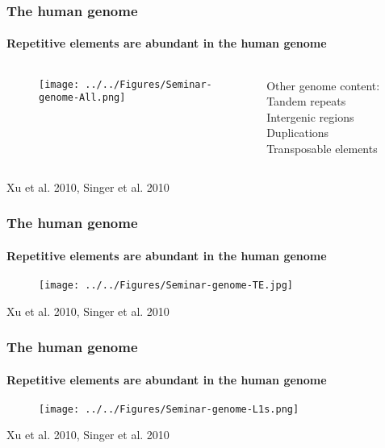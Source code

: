 \documentclass{beamer}
\begin{document}
		\begin{frame} %
			
			\frametitle{The human genome}
			\framesubtitle{Repetitive elements are abundant in the human genome}
			
			\begin{columns}
				\begin{column}{0.6\linewidth}
					
					\begin{figure}
						\texttt{[image: ../../Figures/Seminar-genome-All.png]}			
					\end{figure}
				\end{column}
			
				\begin{column}{0.4\linewidth}
					\begin{block}{Other genome content:}
						Tandem repeats\\
						Intergenic regions\\
						Duplications\\
						Transposable elements
					\end{block}
				\end{column}
			\end{columns}
	
			
			Xu et al. 2010, Singer et al. 2010

		\end{frame}
		
		\begin{frame} %
			
			\frametitle{The human genome}
			\framesubtitle{Repetitive elements are abundant in the human genome}
			
					\begin{figure}
						\texttt{[image: ../../Figures/Seminar-genome-TE.jpg]}
					\end{figure}
						Xu et al. 2010, Singer et al. 2010
		\end{frame}
		
		\begin{frame} %
			
			\frametitle{The human genome}
			\framesubtitle{Repetitive elements are abundant in the human genome}
			

			\begin{figure}
				\texttt{[image: ../../Figures/Seminar-genome-L1s.png]}
			\end{figure}
			
			Xu et al. 2010, Singer et al. 2010

		\end{frame}
		
\end{document}
